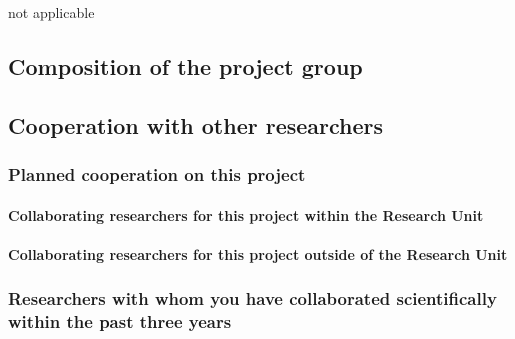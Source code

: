 \documentclass[10pt,fleqn,twoside]{article}
\begin{document}
not applicable
\vspace{-2mm}

\subsection{Composition of the project group}

\todo{[Text]}

\subsection{Cooperation with other researchers}

\subsubsection{Planned cooperation on this project}

\paragraph{Collaborating researchers for this project within the
  Research Unit}


\paragraph{Collaborating researchers for this project outside of
  the Research Unit}


\subsubsection{Researchers with whom you have collaborated scientifically within the past three years}
\end{document}
